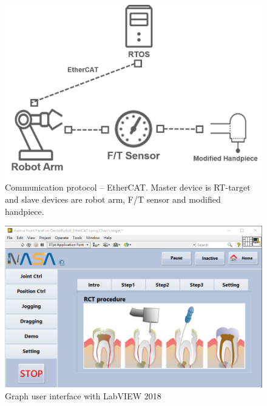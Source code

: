 \begin{figure}[htbp]
\begin{center}
\includegraphics[width=0.7\linewidth]{Images/EtherCAT.png}
\caption{Communication protocol -- EtherCAT. Master device is RT-target and slave devices are robot arm, F/T sensor and modified handpiece.}
\end{center}
\end{figure}
\label{fig:EtherCAT}
\begin{figure}[htbp]
\begin{center}
\includegraphics[width=1\linewidth]{Images/GUI.png}
\caption{Graph user interface with LabVIEW 2018}
\label{fig:GUI}
\end{center}
\end{figure}

\par
